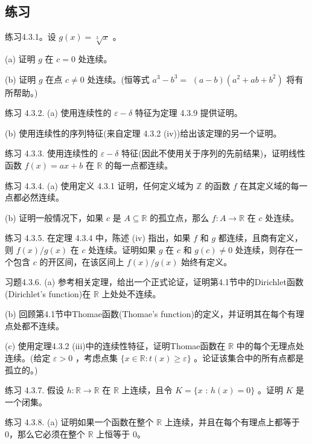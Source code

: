 \subsection{练习}

练习4.3.1。设 \(g\left( x\right)  = \sqrt[3]{x}\) 。

(a) 证明 \(g\) 在 \(c = 0\) 处连续。

(b) 证明 \(g\) 在点 \(c \neq  0\) 处连续。(恒等式 \({a}^{3} - {b}^{3} =\)  \(\left( {a - b}\right) \left( {{a}^{2} + {ab} + {b}^{2}}\right)\) 将有所帮助。)

练习 4.3.2. (a) 使用连续性的 \(\varepsilon  - \delta\) 特征为定理 4.3.9 提供证明。

(b) 使用连续性的序列特征(来自定理 4.3.2 (iv))给出该定理的另一个证明。

练习 4.3.3. 使用连续性的 \(\varepsilon  - \delta\) 特征(因此不使用关于序列的先前结果)，证明线性函数 \(f\left( x\right)  = {ax} + b\) 在 \(\mathbb{R}\) 的每一点都连续。

练习 4.3.4. (a) 使用定义 4.3.1 证明，任何定义域为 \(\mathbb{Z}\) 的函数 \(f\) 在其定义域的每一点都必然连续。

(b) 证明一般情况下，如果 \(c\) 是 \(A \subseteq  \mathbb{R}\) 的孤立点，那么 \(f : A \rightarrow  \mathbb{R}\) 在 \(c\) 处连续。

练习 4.3.5. 在定理 4.3.4 中，陈述 (iv) 指出，如果 \(f\) 和 \(g\) 都连续，且商有定义，则 \(f\left( x\right) /g\left( x\right)\) 在 \(c\) 处连续。证明如果 \(g\) 在 \(c\) 和 \(g\left( c\right)  \neq  0\) 处连续，则存在一个包含 \(c\) 的开区间，在该区间上 \(f\left( x\right) /g\left( x\right)\) 始终有定义。

习题4.3.6. (a) 参考相关定理，给出一个正式论证，证明第4.1节中的Dirichlet函数(Dirichlet’s function)在 \(\mathbb{R}\) 上处处不连续。

(b) 回顾第4.1节中Thomae函数(Thomae's function)的定义，并证明其在每个有理点处都不连续。

(c) 使用定理4.3.2 (iii)中的连续性特征，证明Thomae函数在 \(\mathbb{R}\) 中的每个无理点处连续。(给定 \(\varepsilon  > 0\) ，考虑点集 \(\{ x \in  \mathbb{R} : t\left( x\right)  \geq  \varepsilon \}\) 。论证该集合中的所有点都是孤立的。)

练习 4.3.7. 假设 \(h : \mathbb{R} \rightarrow  \mathbb{R}\) 在 \(\mathbb{R}\) 上连续，且令 \(K = \{ x\) : \(h\left( x\right)  = 0\}\) 。证明 \(K\) 是一个闭集。

练习 4.3.8. (a) 证明如果一个函数在整个 \(\mathbb{R}\) 上连续，并且在每个有理点上都等于 0，那么它必须在整个 \(\mathbb{R}\) 上恒等于 0。

